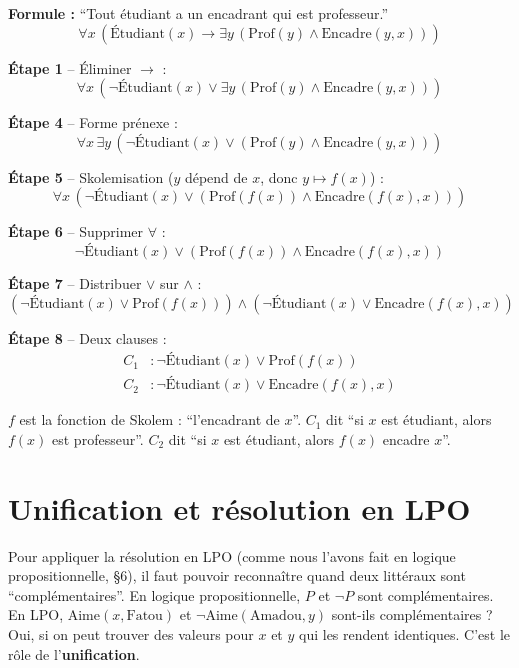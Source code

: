 \documentclass[11pt,a4paper]{article}
\begin{document}
\begin{exemplebox}
\textbf{Formule :} ``Tout étudiant a un encadrant qui est professeur.''
$$\forall x \, (\text{Étudiant}(x) \rightarrow \exists y \, (\text{Prof}(y) \land \text{Encadre}(y, x)))$$

\textbf{Étape 1} -- Éliminer $\rightarrow$ :
$$\forall x \, (\neg\text{Étudiant}(x) \lor \exists y \, (\text{Prof}(y) \land \text{Encadre}(y, x)))$$

\textbf{Étape 4} -- Forme prénexe :
$$\forall x \, \exists y \, (\neg\text{Étudiant}(x) \lor (\text{Prof}(y) \land \text{Encadre}(y, x)))$$

\textbf{Étape 5} -- Skolemisation ($y$ dépend de $x$, donc $y \mapsto f(x)$) :
$$\forall x \, (\neg\text{Étudiant}(x) \lor (\text{Prof}(f(x)) \land \text{Encadre}(f(x), x)))$$

\textbf{Étape 6} -- Supprimer $\forall$ :
$$\neg\text{Étudiant}(x) \lor (\text{Prof}(f(x)) \land \text{Encadre}(f(x), x))$$

\textbf{Étape 7} -- Distribuer $\lor$ sur $\land$ :
$$(\neg\text{Étudiant}(x) \lor \text{Prof}(f(x))) \land (\neg\text{Étudiant}(x) \lor \text{Encadre}(f(x), x))$$

\textbf{Étape 8} -- Deux clauses :
\begin{align*}
C_1 &: \neg\text{Étudiant}(x) \lor \text{Prof}(f(x)) \\
C_2 &: \neg\text{Étudiant}(x) \lor \text{Encadre}(f(x), x)
\end{align*}

$f$ est la fonction de Skolem : ``l'encadrant de $x$''. $C_1$ dit ``si $x$ est étudiant, alors $f(x)$ est professeur''. $C_2$ dit ``si $x$ est étudiant, alors $f(x)$ encadre $x$''.
\end{exemplebox}

\section{Unification et résolution en LPO}

Pour appliquer la résolution en LPO (comme nous l'avons fait en logique propositionnelle, §6), il faut pouvoir reconnaître quand deux littéraux sont ``complémentaires''. En logique propositionnelle, $P$ et $\neg P$ sont complémentaires. En LPO, $\text{Aime}(x, \text{Fatou})$ et $\neg\text{Aime}(\text{Amadou}, y)$ sont-ils complémentaires ? Oui, si on peut trouver des valeurs pour $x$ et $y$ qui les rendent identiques. C'est le rôle de l'\textbf{unification}.
\end{document}
